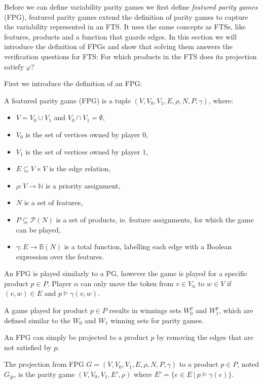 Before we can define variability parity games we first define \textit{featured parity games} (FPG), featured parity games extend the definition of parity games to capture the variability represented in an FTS. It uses the same concepts as FTSs, like features, products and a function that guards edges. In this section we will introduce the definition of FPGs and show that solving them answers the verification questions for FTS: For which products in the FTS does its projection satisfy $\varphi$?

First we introduce the definition of an FPG:
\begin{definition}
	\label{def_FPG}
	A featured parity game (FPG) is a tuple $(V,V_0, V_1, E, \rho, N, P, \gamma)$, where:
	\begin{itemize}
		\item $V = V_0 \cup V_1$ and $V_0 \cap V_1 = \emptyset$,
		\item $V_0$ is the set of vertices owned by player $0$,
		\item $V_1$ is the set of vertices owned by player $1$, 
		\item $E \subseteq V \times V$ is the edge relation,
		\item $\rho :  V \rightarrow \mathbb{N}$ is a priority assignment,
		\item $N$ is a set of features,
		\item $P \subseteq \mathcal{P}(N)$ is a set of products, ie. feature assignments, for which the game can be played,
		\item $\gamma : E \rightarrow \mathbb{B}(N)$ is a total function, labelling each edge with a Boolean expression over the features.
	\end{itemize}
\end{definition}
An FPG is played similarly to a PG, however the game is played for a specific product $p \in P$. Player $\alpha$ can only move the token from $v \in V_\alpha$ to $w \in V$ if $(v,w) \in E$ and $p \models \gamma(v,w)$.

A game played for product $p \in P$ results in winnings sets $W_0^p$ and $W_1^p$, which are defined similar to the $W_0$ and $W_1$ winning sets for parity games.

An FPG can simply be projected to a product $p$ by removing the edges that are not satisfied by $p$.
\begin{definition}
	\label{def_FPG_proj}
The projection from FPG $G = (V,V_0, V_1, E, \rho, N, P, \gamma)$ to a product $p \in P$, noted $G_{|p}$, is the parity game $(V,V_0,V_1, E', \rho)$ where $E' = \{ e \in E\ |\ p \models \gamma(e) \}$.
\end{definition}

